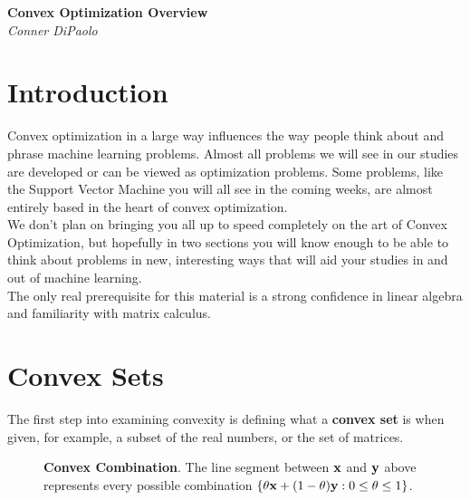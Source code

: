 \documentclass{article}
\begin{document}
\begin{center}
  \Large\textbf{Convex Optimization Overview}\\
  \large\textit{Conner DiPaolo}
\end{center}
\vspace*{1em}

\tableofcontents
\vspace{1em}

\section{Introduction}

Convex optimization in a large way influences the way
people think about and phrase machine learning problems.
Almost all problems we will see in our studies are developed
or can be viewed as optimization problems. Some problems,
like the Support Vector Machine you will all see in the coming
weeks, are almost entirely based in the heart of convex optimization.\\

We don't plan on bringing you all up to speed completely on
the art of Convex Optimization, but hopefully in two sections you
will know enough to be able to think about problems in new, interesting
ways that will aid your studies in and out of machine learning.\\

The only real prerequisite for this material is a strong confidence
in linear algebra and familiarity with matrix calculus.

\section{Convex Sets}



The first step into examining convexity is defining what a
\textbf{convex set} is when given, for example, a subset of the real numbers,
or the set of matrices.

\begin{figure}
    \centering
    \begin{center}
    \end{center}
    \caption{\textbf{Convex Combination}. The line segment between ${\bf x}$ and ${\bf y}$ 
    above represents every possible combination $\{\theta{\bf x} + (1-\theta){\bf y} : 
    0\leq\theta\leq1\}$.}
    \label{fig:convex-comb}
\end{figure}
\end{document}
